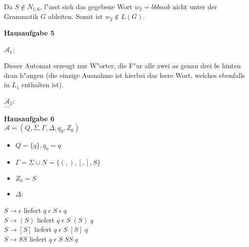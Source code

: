 \documentclass[a4paper,12pt]{article}
\newcommand{\Aufgabe}[1]{
        {
        \vspace*{0.5cm}
        \textbf{Hausaufgabe #1}
        \vspace*{0.2cm}
    }
}
\begin{document}
\bigskip

Da $ S \notin N_{1, 6} $, l"asst sich das gegebene Wort $ w_2 = bbbaab $ nicht unter der Grammatik $ G $ ableiten.
Somit ist $ w_2 \notin L(G) $.

\bigskip

\Aufgabe{5}

$ \mathcal{A}_1 $:


\bigskip

Dieser Automat erzeugt nur W"orter, die F"ur alle zwei $ a $s genau drei $ b $s hinten dran h"angen 
(die einzige Ausnahme ist hierbei das leere Wort, welches ebenfalls in $ L_1 $ enthalten ist).

\newpage

$ \mathcal{A}_2 $: \\
$ \dots $

\Aufgabe{6} \\
$ \mathcal{A} = (Q, \Sigma, \Gamma, \Delta, q_0, Z_0) $
\begin{itemize}
    \item $ Q = \{q\}, q_0 = q $
    \item $ \Gamma  = \Sigma \cup N = \{(, ), [, ], S\} $
    \item $ Z_0 = S $
    \item $ \Delta $:
\end{itemize}

$ S \rightarrow \epsilon $ liefert $ q \; \epsilon \; S \; \epsilon \; q $ \\
$ S \rightarrow (S) $ liefert $ q \; \epsilon \; S \; (S) \; q $ \\
$ S \rightarrow [S] $ liefert $ q \; \epsilon \; S \; [S] \; q $ \\
$ S \rightarrow SS $ liefert $ q \; \epsilon \; S \; SS \; q $
\end{document}
